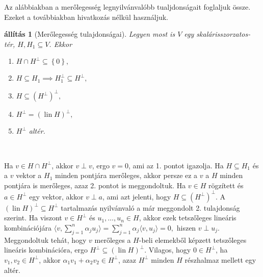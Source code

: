 \documentclass[9pt, a4paper, showtrims]{memoir}
\makeatletter
\renewenvironment{proof}[1][\proofname]
    {\par\pushQED{\qed}%
    \normalfont \topsep6\p@\@plus6\p@\relax
    \trivlist
    \item[\hskip\labelsep
        \itshape
    #1\@addpunct{:}]\ignorespaces}
    {\popQED\endtrivlist\@endpefalse}
\theoremstyle{plain}
\newtheorem{proposition}{állítás}[chapter]
\theoremstyle{remark}
\theoremstyle{definition}
\DeclareMathOperator{\lin}{lin}
\newcommand{\ip}[2]{\langle#1,#2\rangle}
\makeatother
\begin{document}
Az alábbiakban a merőlegesség legnyilvánvalóbb tualjdonságait foglaljuk össze. 
Ezeket a továbbiakban hivatkozás nélkül használjuk.
\begin{proposition}[Merőlegesség tulajdonságai]
    Legyen most is $V$ egy skalárisszorzatos-tér, $H,H_1\subseteq V$.
    Ekkor
    \begin{enumerate}
        \item $H\cap H^{\perp}\subseteq\left\{ 0 \right\},$
        \item $H\subseteq H_1\implies H_1^\perp\subseteq H^\perp,$
        \item $H\subseteq \left( H^\perp \right)^\perp,$
        \item $H^{\perp}=\left( \lin H \right)^\perp,$
        \item $H^\perp$ altér.\qedhere
    \end{enumerate}
\end{proposition}\
\begin{proof}
    Ha $v\in H\cap H^\perp$, akkor $v\perp v$, ergo $v=0$, ami az 1. pontot igazolja.
    Ha $H\subseteq H_1$ és a $v$ vektor a $H_1$ minden pontjára merőleges, akkor persze ez a $v$ a $H$ minden pontjára is merőleges,
    azaz 2. pontot is meggondoltuk.
    Ha $v\in H$ rögzített és $a\in H^\perp$ egy vektor, akkor $v\perp a$, ami azt jelenti, hogy $H\subseteq \left( H^\perp \right)^\perp$.
    A $(\lin H)^\perp\subseteq H^\perp$ tartalmazás nyilvánvaló a már meggondolt 2. tulajdonság szerint. 
    Ha viszont $v\in H^\perp$ és $u_1,\dots,u_n\in H$, akkor ezek tetszőleges lineáris kombinációjára
    \begin{math}
        \ip{v}{\sum_{j=1}^n\alpha_ju_j}
        =
        \sum_{j=1}^n\alpha_j\ip{v}{u_j}
        =
        0,
    \end{math}
    hiszen $v\perp u_j$.
    Meggondoltuk tehát, hogy $v$ merőleges a $H$-beli elemekből képzett tetszőleges lineáris kombinációra,
    ergo $H^\perp\subseteq\left( \lin H \right)^\perp.$
    Vilagos, hogy $0\in H^\perp$, ha $v_1,v_2\in H^\perp$, akkor $\alpha_1v_1+\alpha_2v_2\in H^\perp$, azaz
    $H^\perp$ minden $H$ részhalmaz mellett egy altér.
\end{proof} 
\end{document}
